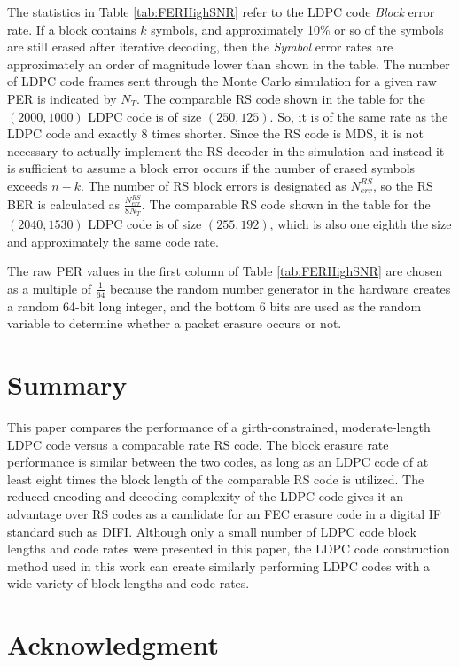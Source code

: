 \documentclass[conference]{IEEEtran}
\begin{document}
The statistics in Table \ref{tab:FERHighSNR} refer to the LDPC code \textit{Block} error rate.  If a block contains $k$ symbols, and approximately 10\% or so of the symbols are still erased after iterative decoding, then the \textit{Symbol} error rates are approximately an order of magnitude lower than shown in the table.  The number of LDPC code frames sent through the Monte Carlo simulation for a given raw PER is indicated by $N_T$.  The comparable RS code shown in the table for the $(2000, 1000)$ LDPC code is of size $(250, 125)$.  So, it is of the same rate as the LDPC code and exactly 8 times shorter.  Since the RS code is MDS, it is not necessary to actually implement the RS decoder in the simulation and instead it is sufficient to assume a block error occurs if the number of erased symbols exceeds $n-k$.  The number of RS block errors is designated as $N^{RS}_{err}$, so the RS BER is calculated as $\frac{N^{RS}_{err}}{8N_T}$.  The comparable RS code shown in the table for the $(2040, 1530)$ LDPC code is of size $(255, 192)$, which is also one eighth the size and approximately the same code rate. 

The raw PER values in the first column of Table \ref{tab:FERHighSNR} are chosen as a multiple of $\frac{1}{64}$ because the random number generator in the hardware creates a random 64-bit long integer, and the bottom 6 bits are used as the random variable to determine whether a packet erasure occurs or not.

\section{Summary}\label{sec:Summary}

This paper compares the performance of a girth-constrained, moderate-length LDPC code versus a comparable rate RS code.  The block erasure rate performance is similar between the two codes, as long as an LDPC code of at least eight times the block length of the comparable RS code is utilized.  The reduced encoding and decoding complexity of the LDPC code gives it an advantage over RS codes as a candidate for an FEC erasure code in a digital IF standard such as DIFI.  Although only a small number of LDPC code block lengths and code rates were presented in this paper, the LDPC code construction method used in this work can create similarly performing LDPC codes with a wide variety of block lengths and code rates.

\section*{Acknowledgment}
\end{document}

